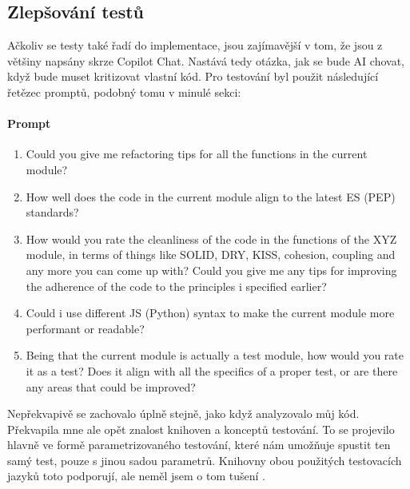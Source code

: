 \documentclass[FM,DP]{tulthesis}
\begin{document}
		\subsection{Zlepšování testů}
		Ačkoliv se testy také řadí do implementace, jsou zajímavější v tom, že jsou z většiny napsány skrze Copilot Chat. Nastává tedy otázka, jak se bude AI chovat, když bude muset kritizovat vlastní kód. Pro testování byl použit následující řetězec promptů, podobný tomu v minulé sekci:
		
		\vspace{0.6em}
		\begin{tcolorbox}[colback=white,colframe=black]
			\paragraph{Prompt}
			\begin{enumerate}
				\item{Could you give me refactoring tips for all the functions in the current module?}
				\item{How well does the code in the current module align to the latest ES (PEP) standards?}
				\item{How would you rate the cleanliness of the code in the functions of the XYZ module, in terms of things like SOLID, DRY, KISS, cohesion, coupling and any more you can come up with? Could you give me any tips for improving the adherence of the code to the principles i specified earlier?}
				\item{Could i use different JS (Python) syntax to make the current module more performant or readable?}
				\item{Being that the current module is actually a test module, how would you rate it as a test? Does it align with all the specifics of a proper test, or are there any areas that could be improved?}
			\end{enumerate}
		\end{tcolorbox}
		
		Nepřekvapivě se zachovalo úplně stejně, jako když analyzovalo můj kód. Překvapila mne ale opět znalost knihoven a konceptů testování. To se projevilo hlavně ve formě parametrizovaného testování, které nám umožňuje spustit ten samý test, pouze s jinou sadou parametrů. Knihovny obou použitých testovacích jazyků toto podporují, ale neměl jsem o tom tušení \cite{parametrized_testing_be} \cite{parametrized_testing_fe}.
		
\end{document}
